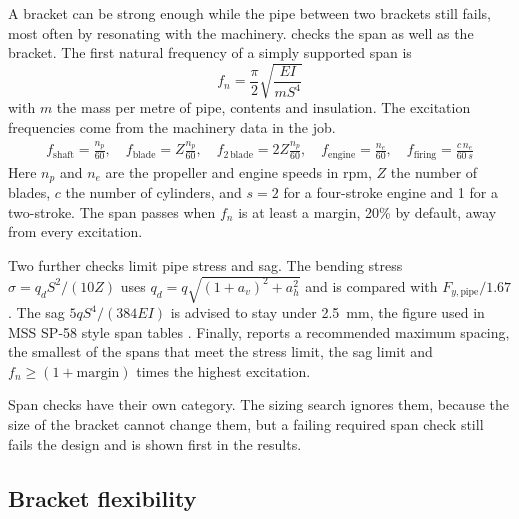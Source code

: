 A bracket can be strong enough while the pipe between two brackets still
fails, most often by resonating with the machinery. \NEMO{} checks the span
as well as the bracket. The first natural frequency of a simply supported
span is
\begin{equation}
f_n = \frac{\pi}{2}\sqrt{\frac{EI}{m S^4}}
\label{eq:span-frequency}
\end{equation}
with $m$ the mass per metre of pipe, contents and insulation. The excitation
frequencies come from the machinery data in the job.
\begin{gather}
f_\text{shaft} = \frac{n_p}{60}, \quad
f_\text{blade} = Z\frac{n_p}{60}, \quad
f_{2\,\text{blade}} = 2Z\frac{n_p}{60}, \quad
f_\text{engine} = \frac{n_e}{60}, \quad
f_\text{firing} = \frac{c\, n_e}{60\,s}
\label{eq:excitations}
\end{gather}
Here $n_p$ and $n_e$ are the propeller and engine speeds in rpm, $Z$ the
number of blades, $c$ the number of cylinders, and $s = 2$ for a four-stroke
engine and 1 for a two-stroke. The span passes when $f_n$ is at least a
margin, 20\% by default, away from every excitation.

Two further checks limit pipe stress and sag. The bending stress
$\sigma = q_d S^2/(10Z)$ uses $q_d = q\sqrt{(1+a_v)^2 + a_h^2}$ and is
compared with $F_{y,\text{pipe}}/1.67$. The sag $5qS^4/(384EI)$ is advised to
stay under 2.5~mm, the figure used in MSS SP-58 style span tables
\cite{mssSP58}. Finally, \NEMO{} reports a recommended maximum spacing, the
smallest of the spans that meet the stress limit, the sag limit and
$f_n \geq (1 + \text{margin})$ times the highest excitation.

Span checks have their own category. The sizing search ignores them, because
the size of the bracket cannot change them, but a failing required span check
still fails the design and is shown first in the results.

\subsection{Bracket flexibility}
\label{sec:bracket-flexibility}

